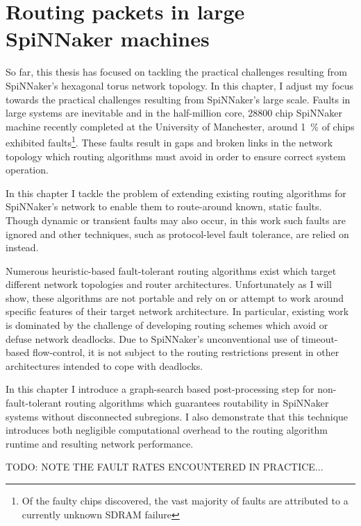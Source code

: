 \chapter{Routing packets in large SpiNNaker machines}
	
	\label{sec:routing}
	
	So far, this thesis has focused on tackling the practical challenges
	resulting from SpiNNaker's hexagonal torus network topology. In this chapter,
	I adjust my focus towards the practical challenges resulting from SpiNNaker's
	large scale. Faults in large systems are inevitable and in the half-million
	core, \num{28800} chip SpiNNaker machine recently completed at the University
	of Manchester, around \SI{1}{\percent} of chips exhibited faults\footnote{Of
	the faulty chips discovered, the vast majority of faults are attributed to a
	currently unknown SDRAM failure}. These faults result in gaps and broken
	links in the network topology which routing algorithms must avoid in order to
	ensure correct system operation.
	
	In this chapter I tackle the problem of extending existing routing algorithms
	for SpiNNaker's network to enable them to route-around known, static faults.
	Though dynamic or transient faults may also occur, in this work such faults
	are ignored and other techniques, such as protocol-level fault tolerance, are
	relied on instead.
	
	Numerous heuristic-based fault-tolerant routing algorithms exist which target
	different network topologies and router architectures. Unfortunately as I
	will show, these algorithms are not portable and rely on or attempt to work
	around specific features of their target network architecture. In particular,
	existing work is dominated by the challenge of developing routing schemes
	which avoid or defuse network deadlocks. Due to SpiNNaker's unconventional
	use of timeout-based flow-control, it is not subject to the routing
	restrictions present in other architectures intended to cope with deadlocks.
	
	In this chapter I introduce a graph-search based post-processing step for
	non-fault-tolerant routing algorithms which guarantees routability in
	SpiNNaker systems without disconnected subregions. I also demonstrate that
	this technique introduces both negligible computational overhead to the
	routing algorithm runtime and resulting network performance.
	
	TODO: NOTE THE FAULT RATES ENCOUNTERED IN PRACTICE...
	
